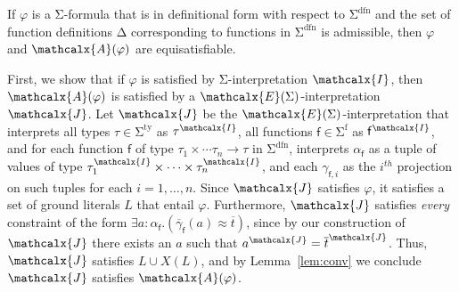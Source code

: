 \documentclass[runningheads,a4paper]{llncs}
\newcommand\DDD{\Delta}
\newcommand{\con}[1]{\mathsf{#1}}
\renewcommand\vec[1]{\overline{#1}}
\let\oldchi=\chi
\def\chi{{\vthinspace\oldchi}}
\let\oldSigma=\Sigma
\def\Sigma{\mathrm{\oldSigma}}
\let\oldDelta=\Delta
\def\Delta{\mathrm{\oldDelta}}
\newcommand{\teq}{\approx}
\newcommand{\I}{\mathcalx{I}}
\newcommand{\J}{\mathcalx{J}}
\newcommand{\conv}{\mathcalx{A}}
\newcommand{\stypes}[1]{#1^\mathrm{ty}}
\newcommand{\sfuns}[1]{#1^\mathrm{f}}
\newcommand{\sfundefs}[1]{#1^\mathrm{dfn}}
\newcommand{\ppos}{{+}}
\newcommand\ty[1]{\con{#1}}
\newcommand{\Bool}{\ty{Bool}}
\newcommand\concret{\gamma} %
\newcommand{\vecfarg}[1]{\vec{\concret}_{#1}}
\newcommand{\fargx}[2]{\concret_{#1,#2}}
\newcommand{\fargtype}[1]{\alpha_{#1}}
\newcommand{\extendsig}[1]{\mathcalx{E}( #1 )}
\newcommand{\vthinspace}{\kern+0.083333em}
\newcommand{\typ}[1]{^{\vthinspace #1}}
\newcommand{\absconstraints}{X}
\begin{document}
\begin{theorem}\label{thm:equi}
If $\varphi$ is a\/ $\Sigma$-formula that is in definitional form with respect to\/
$\sfundefs{\Sigma}$
and the set of function definitions\/ $\DDD$ corresponding to functions in
$\sfundefs{\Sigma}$ is admissible, then\/ $\varphi$ and\/ $\conv( \varphi )$ are
equisatisfiable.
\end{theorem}
\begin{proofsketch}
First, we show that if $\varphi$ is satisfied by $\Sigma$-interpretation $\I$, then $\conv( \varphi )$ is satisfied by a $\extendsig{\Sigma}$-interpretation $\J$.
Let $\J$ be the $\extendsig{\Sigma}$-interpretation that interprets all types $\tau \in \stypes{\Sigma}$ as $\tau^\I$,
all functions $\con{f} \in \sfuns{\Sigma}$ as $\con{f}^\I$,
and for each function $\con{f}$ of type $\tau_1 \times \cdots \tau_n \rightarrow \tau$ in $\sfundefs{\Sigma}$,
interprets $\fargtype{\con{f}}$ as a tuple of values of type $\tau_1^\I \times \cdots \times \tau_n^\I$,
and each $\fargx{\con{f}}{i}$ as the $i^{th}$ projection on such tuples for each $i = 1, \ldots, n$.
Since $\J$ satisfies $\varphi$, it satisfies a set of ground literals $L$ that entail $\varphi$.
Furthermore, $\J$ satisfies \emph{every} constraint of the form $\exists a : {\fargtype{\con{f}}}. ( \vecfarg{\con{f}}( a ) \teq \vec t )$,
since by our construction of $\J$ there exists an $a$ such that $a^\J = \vec t^\J$.
Thus, $\J$ satisfies $L \cup \absconstraints( L )$, and by Lemma~\ref{lem:conv} we conclude $\J$ satisfies $\conv( \varphi )$.


\end{proofsketch}
\end{document}
